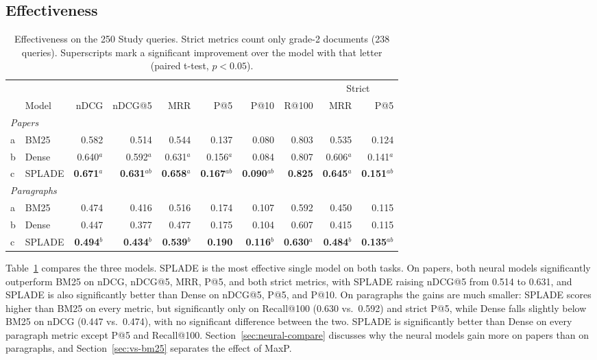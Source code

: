 \documentclass[sigconf,nonacm]{acmart}
\begin{document}
\subsection{Effectiveness}
\label{sec:effectiveness}
\begin{table}[t]
  \caption{Effectiveness on the 250 Study queries. Strict metrics count only
    grade-2 documents (238 queries). Superscripts mark a significant
    improvement over the model with that letter (paired t-test, $p < 0.05$).}
  \label{tab:main}
  \small
  \begin{tabular}{llrrrrrrrr}
    \toprule
    & & & & & & & & \multicolumn{2}{c}{Strict} \\
    \cmidrule(lr){9-10}
    & Model & nDCG & nDCG@5 & MRR & P@5 & P@10 & R@100 & MRR & P@5 \\
    \midrule
    \multicolumn{10}{l}{\emph{Papers}} \\
    a & BM25   & 0.582 & 0.514 & 0.544 & 0.137 & 0.080 & 0.803 & 0.535 & 0.124 \\
    b & Dense  & 0.640$^{a}$ & 0.592$^{a}$ & 0.631$^{a}$ & 0.156$^{a}$ & 0.084 & 0.807 & 0.606$^{a}$ & 0.141$^{a}$ \\
    c & SPLADE & \textbf{0.671}$^{a}$ & \textbf{0.631}$^{ab}$ & \textbf{0.658}$^{a}$ & \textbf{0.167}$^{ab}$ & \textbf{0.090}$^{ab}$ & \textbf{0.825} & \textbf{0.645}$^{a}$ & \textbf{0.151}$^{ab}$ \\
    \midrule
    \multicolumn{10}{l}{\emph{Paragraphs}} \\
    a & BM25   & 0.474 & 0.416 & 0.516 & 0.174 & 0.107 & 0.592 & 0.450 & 0.115 \\
    b & Dense  & 0.447 & 0.377 & 0.477 & 0.175 & 0.104 & 0.607 & 0.415 & 0.115 \\
    c & SPLADE & \textbf{0.494}$^{b}$ & \textbf{0.434}$^{b}$ & \textbf{0.539}$^{b}$ & \textbf{0.190} & \textbf{0.116}$^{b}$ & \textbf{0.630}$^{a}$ & \textbf{0.484}$^{b}$ & \textbf{0.135}$^{ab}$ \\
    \bottomrule
  \end{tabular}
\end{table}

Table~\ref{tab:main} compares the three models. SPLADE is the most
effective single model on both tasks. On papers, both neural models
significantly outperform BM25 on nDCG, nDCG@5, MRR, P@5, and both strict
metrics, with SPLADE raising nDCG@5 from 0.514 to 0.631, and SPLADE is
also significantly better than Dense on nDCG@5, P@5, and P@10. On
paragraphs the gains are much smaller: SPLADE scores higher than BM25 on
every metric, but significantly only on Recall@100 (0.630 vs.\ 0.592) and
strict P@5, while Dense falls slightly below BM25 on nDCG (0.447 vs.\
0.474), with no significant difference between the two. SPLADE is
significantly better than Dense on every paragraph metric except P@5 and
Recall@100. Section~\ref{sec:neural-compare} discusses why the neural
models gain more on papers than on paragraphs, and
Section~\ref{sec:vs-bm25} separates the effect of MaxP.
\end{document}
